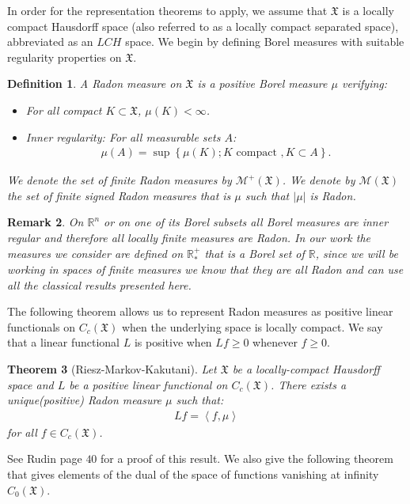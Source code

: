 \documentclass[11pt,a4paper]{article}
\newcommand{\RR}{\mathbb{R}}
\newcommand{\RRP}{\mathbb{R}^+_*}
\newcommand{\MC}{\mathcal{M}}
\newcommand{\XF}{\mathfrak{X}}
\newcommand{\brac}[1]{\left\langle#1\right\rangle}
\newtheorem{theorem}{Theorem}[section]
\newtheorem{remark}[theorem]{Remark}
\newtheorem{definition}[theorem]{Definition}
\begin{document}
In order for the representation theorems to apply, we assume that $\XF$ is a locally compact Hausdorff space (also referred to as a locally compact separated space), abbreviated as an $LCH$ space. We begin by defining Borel measures with suitable regularity properties on $\XF$.
\begin{definition}
    A Radon measure on $\XF$ is a positive Borel measure $\mu$ verifying:
    \begin{itemize}
        \item For all compact $K\subset \XF$, $\mu(K) < \infty$.
        \item Inner regularity: For all measurable sets $A$:
        \begin{align*}
            \mu(A) = \sup{\left\lbrace \mu(K) ; K \text{ compact }, K \subset A\right\rbrace}.
        \end{align*}
    \end{itemize}
    We denote the set of finite Radon measures by $\MC^+(\XF)$. We denote by $\MC(\XF)$ the set of finite signed Radon measures that is $\mu$ such that $|\mu|$ is Radon.
\end{definition}
\begin{remark}
    On $\RR^n$ or on one of its Borel subsets all Borel measures are inner regular \cite[Chapter $1$, Theorem $4$]{evans2018measure} and therefore all locally finite measures are Radon. In our work the measures we consider are defined on $\RRP$ that is a Borel set of $\RR$, since we will be working in spaces of finite measures we know that they are all Radon and can use all the classical results presented here. 
\end{remark}
 The following theorem allows us to represent Radon measures as positive linear functionals on $C_c(\XF)$ when the underlying space is locally compact. We say that a linear functional $L$ is positive when $Lf \geq 0$ whenever $f \geq 0$.
\begin{theorem}[Riesz-Markov-Kakutani]
    Let $\XF$ be a locally-compact Hausdorff space and $L$ be a positive linear functional on $C_c(\XF)$. There exists a unique(positive) Radon measure $\mu$ such that:
    \begin{align*}
        Lf = \brac{f,\mu}
    \end{align*}
    for all $f \in C_c(\XF)$.
\end{theorem}
See Rudin \cite{rudin1987real} page $40$ for a proof of this result. We also give the following theorem that gives elements of the dual of the space of functions vanishing at infinity $C_0(\XF)$.
\end{document}
